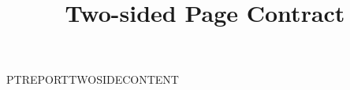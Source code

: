 \documentclass[twoside,nominted]{pt-report}
\title{Two-sided Page Contract}
\date{}
\begin{document}
\maketitle
\noindent PTREPORTTWOSIDECONTENT
\end{document}
